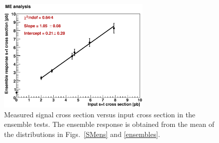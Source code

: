 \vspace{0.1in}
\begin{figure}[!h!tbp]
\begin{center}
\includegraphics[width=0.65\textwidth]{figures/ensembles/ME_analysis}
\end{center}
\vspace{-0.1in}
\caption[calibration]{Measured signal cross section versus input
cross section in the ensemble tests. The ensemble response is obtained
from the mean of the distributions in Figs.~\ref{SMens} and
\ref{ensembles}.}
\label{calibration}
\end{figure}

